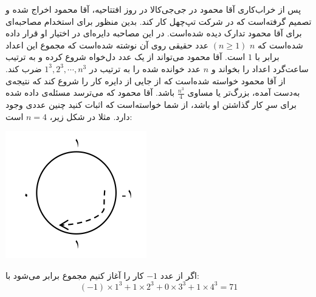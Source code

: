 \EXERCISE
پس از خراب‌کاری آقا محمود در جی‌جی‌کالا در روز افتتاحیه، آقا محمود اخراج شده و تصمیم گرفته‌است که در شرکت تپ‌چهل کار کند. بدین منظور برای استخدام مصاحبه‌ای برای آقا محمود تدارک دیده شده‌است. در این مصاحبه دایره‌ای در اختیار او قرار داده شده‌است که
$n$
$(n \geq 1)$
عدد حقیقی روی آن نوشته شده‌است که مجموع این اعداد برابر با
$1$
است. آقا محمود می‌تواند از یک عدد دل‌خواه شروع کرده و به ترتیب ساعت‌گرد اعداد را بخواند و
$n$
عدد خوانده شده را به ترتیب در
$1^3, 2^3, \cdots, n^3$
ضرب کند. از آقا محمود خواسته شده‌است که از جایی از دایره کار را شروع کند که نتیجه‌ی به‌دست آمده، بزرگ‌تر یا مساوی
$\frac{n^3}{4}$
باشد. آقا محمود که می‌ترسد مسئله‌ی داده شده برای سرِ کار گذاشتن او باشد، از شما خواسته‌است که اثبات کنید چنین عددی وجود دارد. مثلا در شکل زیر،
$n = 4$
است:
\begin{center}
     	\includegraphics[scale=0.2]{./8.png}
\end{center}
اگر از عدد
$-1$
کار را آغاز کنیم مجموع برابر می‌شود با:
$$(-1) \times 1^3 + 1 \times 2^3 + 0 \times 3^3 + 1 \times 4^3 = 71$$